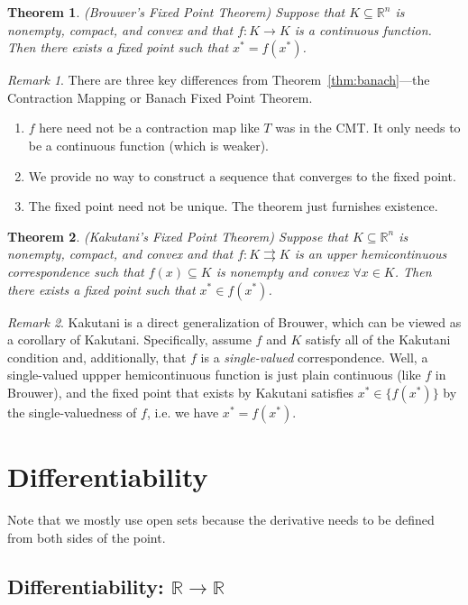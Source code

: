 \documentclass[12pt]{book}
\numberwithin{equation}{section} %
\theoremstyle{plain}
\newtheorem{thm}{Theorem}[section]
\theoremstyle{definition}
\theoremstyle{remark}
\newtheorem*{rmk}{Remark}
\newcommand{\R}{\mathbb{R}}
\newcommand{\Rn}{\mathbb{R}^n}
\begin{document}
\begin{thm}\emph{(Brouwer's Fixed Point Theorem)}
Suppose that $K\subseteq \Rn$ is nonempty, compact, and convex and that
$f:K\rightarrow K$ is a continuous function. Then there exists a fixed
point such that $x^*=f(x^*)$.
\end{thm}
\begin{rmk}
There are three key differences from Theorem~\ref{thm:banach}---the
Contraction Mapping or Banach Fixed Point Theorem.
\begin{enumerate}
  \item $f$ here need not be a contraction map like $T$ was in the CMT.
    It only needs to be a continuous function (which is weaker).
  \item We provide no way to construct a sequence that converges to the
    fixed point.
  \item The fixed point need not be unique. The theorem just furnishes
    existence.
\end{enumerate}
\end{rmk}

\begin{thm}\emph{(Kakutani's Fixed Point Theorem)}
Suppose that $K\subseteq \Rn$ is nonempty, compact, and convex and that
$f:K\rightrightarrows K$ is an upper hemicontinuous correspondence
such that $f(x)\subseteq K$ is nonempty and convex $\forall x\in K$.
Then there exists a fixed point such that $x^*\in f(x^*)$.
\end{thm}
\begin{rmk}
Kakutani is a direct generalization of Brouwer, which can be viewed as a
corollary of Kakutani. Specifically, assume $f$ and $K$ satisfy all of
the Kakutani condition and, additionally, that $f$ is a
\emph{single-valued} correspondence.  Well, a single-valued uppper
hemicontinuous function is just plain continuous (like $f$ in Brouwer),
and the fixed point that exists by Kakutani satisfies $x^*\in
\{f(x^*)\}$ by the single-valuedness of $f$, i.e. we have $x^*=f(x^*)$.
\end{rmk}


\clearpage
\section{Differentiability}

Note that we mostly use open sets because the derivative needs to be
defined from both sides of the point.

\subsection{Differentiability: $\R\rightarrow\R$}
\end{document}
